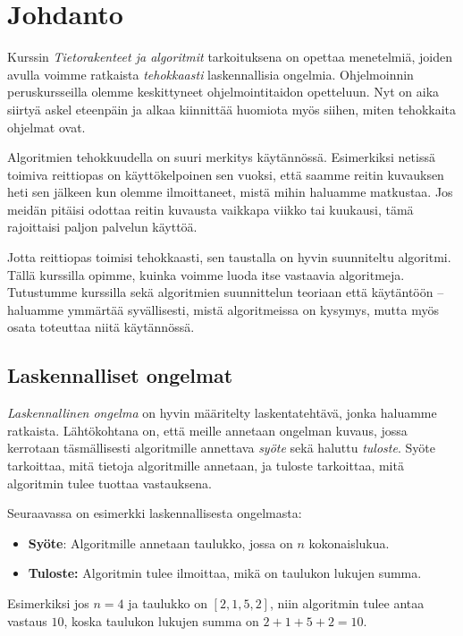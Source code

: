 \chapter{Johdanto}

Kurssin \emph{Tietorakenteet ja algoritmit} tarkoituksena
on opettaa menetelmiä, joiden avulla voimme ratkaista
\emph{tehokkaasti} laskennallisia ongelmia.
Ohjelmoinnin peruskursseilla olemme keskittyneet
ohjelmointitaidon opetteluun.
Nyt on aika siirtyä askel eteenpäin ja alkaa kiinnittää
huomiota myös siihen, miten tehokkaita ohjelmat ovat.

Algoritmien tehokkuudella on suuri merkitys käytännössä.
Esimerkiksi netissä toimiva reittiopas on käyttökelpoinen sen vuoksi,
että saamme reitin kuvauksen heti sen jälkeen kun olemme
ilmoittaneet, mistä mihin haluamme matkustaa.
Jos meidän pitäisi odottaa reitin kuvausta vaikkapa viikko tai kuukausi,
tämä rajoittaisi paljon palvelun käyttöä.

Jotta reittiopas toimisi tehokkaasti, sen taustalla on
hyvin suunniteltu algoritmi.
Tällä kurssilla opimme, kuinka voimme luoda itse vastaavia algoritmeja.
Tutustumme kurssilla sekä algoritmien suunnittelun teoriaan että
käytäntöön -- haluamme ymmärtää syvällisesti, mistä algoritmeissa on kysymys,
mutta myös osata toteuttaa niitä käytännössä.

\section{Laskennalliset ongelmat}

\emph{Laskennallinen ongelma} on hyvin määritelty laskentatehtävä,
jonka haluamme ratkaista.
Lähtökohtana on, että meille annetaan ongelman kuvaus,
jossa kerrotaan täsmällisesti algoritmille annettava
\emph{syöte} sekä haluttu \emph{tuloste}.
Syöte tarkoittaa, mitä tietoja algoritmille annetaan,
ja tuloste tarkoittaa, mitä algoritmin tulee tuottaa vastauksena.

Seuraavassa on esimerkki laskennallisesta ongelmasta:

\begin{itemize}
\item \textbf{Syöte}: Algoritmille annetaan taulukko,
jossa on $n$ kokonaislukua.
\item \textbf{Tuloste:} Algoritmin tulee ilmoittaa,
mikä on taulukon lukujen summa.
\end{itemize}

Esimerkiksi jos $n=4$ ja taulukko on $[2,1,5,2]$,
niin algoritmin tulee antaa vastaus $10$,
koska taulukon lukujen summa on $2+1+5+2=10$.

